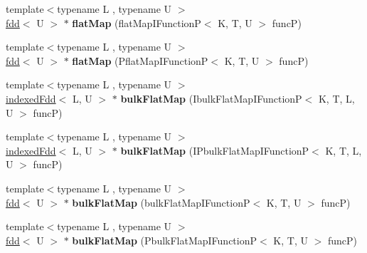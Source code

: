 \begin{DoxyCompactItemize}
\hypertarget{classfaster_1_1indexedFdd_ac43ac811a8e6341d835990da6d43e422}{}\label{classfaster_1_1indexedFdd_ac43ac811a8e6341d835990da6d43e422} 
{\footnotesize template$<$typename L , typename U $>$ }\\\hyperlink{classfaster_1_1fdd}{fdd}$<$ U $>$ $\ast$ {\bfseries flat\+Map} (flat\+Map\+I\+FunctionP$<$ K, T, U $>$ funcP)
\item 
\hypertarget{classfaster_1_1indexedFdd_aa97f249971caca71c70a03bb170b3829}{}\label{classfaster_1_1indexedFdd_aa97f249971caca71c70a03bb170b3829} 
{\footnotesize template$<$typename L , typename U $>$ }\\\hyperlink{classfaster_1_1fdd}{fdd}$<$ U $>$ $\ast$ {\bfseries flat\+Map} (Pflat\+Map\+I\+FunctionP$<$ K, T, U $>$ funcP)
\item 
\hypertarget{classfaster_1_1indexedFdd_a3912bcd68abe5012c0573f1b2df4c5ad}{}\label{classfaster_1_1indexedFdd_a3912bcd68abe5012c0573f1b2df4c5ad} 
{\footnotesize template$<$typename L , typename U $>$ }\\\hyperlink{classfaster_1_1indexedFdd}{indexed\+Fdd}$<$ L, U $>$ $\ast$ {\bfseries bulk\+Flat\+Map} (Ibulk\+Flat\+Map\+I\+FunctionP$<$ K, T, L, U $>$ funcP)
\item 
\hypertarget{classfaster_1_1indexedFdd_a1c49efc7eac095aaefb1446f31147536}{}\label{classfaster_1_1indexedFdd_a1c49efc7eac095aaefb1446f31147536} 
{\footnotesize template$<$typename L , typename U $>$ }\\\hyperlink{classfaster_1_1indexedFdd}{indexed\+Fdd}$<$ L, U $>$ $\ast$ {\bfseries bulk\+Flat\+Map} (I\+Pbulk\+Flat\+Map\+I\+FunctionP$<$ K, T, L, U $>$ funcP)
\item 
\hypertarget{classfaster_1_1indexedFdd_aa06dfd667524b0ec9e10edf666414715}{}\label{classfaster_1_1indexedFdd_aa06dfd667524b0ec9e10edf666414715} 
{\footnotesize template$<$typename L , typename U $>$ }\\\hyperlink{classfaster_1_1fdd}{fdd}$<$ U $>$ $\ast$ {\bfseries bulk\+Flat\+Map} (bulk\+Flat\+Map\+I\+FunctionP$<$ K, T, U $>$ funcP)
\item 
\hypertarget{classfaster_1_1indexedFdd_a811004fa92fc8685402fd10584b7863a}{}\label{classfaster_1_1indexedFdd_a811004fa92fc8685402fd10584b7863a} 
{\footnotesize template$<$typename L , typename U $>$ }\\\hyperlink{classfaster_1_1fdd}{fdd}$<$ U $>$ $\ast$ {\bfseries bulk\+Flat\+Map} (Pbulk\+Flat\+Map\+I\+FunctionP$<$ K, T, U $>$ funcP)
\item 
\hypertarget{classfaster_1_1indexedFdd_a1b2c52816eb473decdd3e06c70db255b}{}\label{classfaster_1_1indexedFdd_a1b2c52816eb473decdd3e06c70db255b} 

\end{DoxyCompactItemize}
